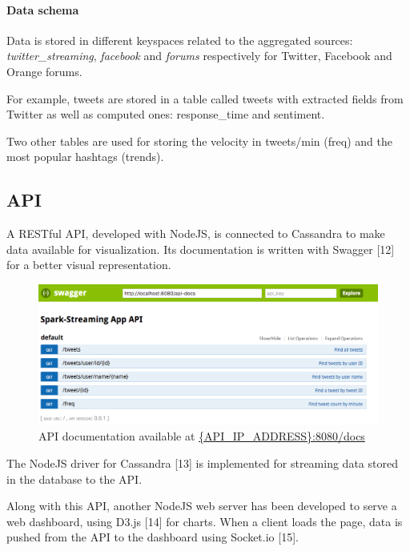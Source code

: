\documentclass[11pt]{article}
\begin{document}
\paragraph{Data schema}

Data is stored in different keyspaces related to the aggregated sources: \textit{twitter\_streaming}, \textit{facebook} and \textit{forums} respectively for \textsf{Twitter}, \textsf{Facebook} and \textsf{Orange} forums.

For example, tweets are stored in a table called tweets with extracted fields from \textsf{Twitter} as well as computed ones: response\_time and sentiment.
          
Two other tables are used for storing the velocity in tweets/min (freq) and the most popular hashtags (trends).

\subsection{API}

A RESTful API, developed with \textsf{NodeJS}, is connected to \textsf{Cassandra} to make data available for visualization. 
Its documentation is written with \textsf{Swagger} [12] for a better visual representation.

\begin{figure}[h!]
    \centering
    \includegraphics[scale=0.4]{img/api-docs.png}
    \caption{API documentation available at \url{{API_IP_ADDRESS}:8080/docs}}
    \label{socket}
\end{figure}

The \textsf{NodeJS} driver for \textsf{Cassandra} [13] is implemented for streaming data stored in the database to the API.

Along with this API, another \textsf{NodeJS} web server has been developed to serve a web dashboard, using \textsf{D3.js} [14] for charts. When a client loads the page, data is pushed from the API to the dashboard using \textsf{Socket.io} [15].
\end{document}
